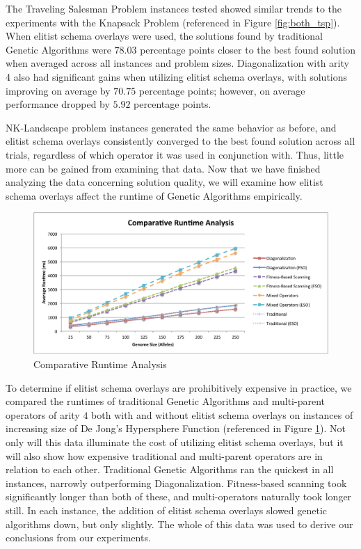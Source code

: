 The Traveling Salesman Problem instances tested showed similar trends to the experiments with the Knapsack Problem (referenced in Figure \ref{fig:both_tsp}). When elitist schema overlays were used, the solutions found by traditional Genetic Algorithms were $78.03$ percentage points closer to the best found solution when averaged across all instances and problem sizes. Diagonalization with arity 4 also had significant gains when utilizing elitist schema overlays, with solutions improving on average by $70.75$ percentage points; however, on average performance dropped by $5.92$ percentage points.


NK-Landscape problem instances generated the same behavior as before, and elitist schema overlays consistently converged to the best found solution across all trials, regardless of which operator it was used in conjunction with. Thus, little more can be gained from examining that data. Now that we have finished analyzing the data concerning solution quality, we will examine how elitist schema overlays affect the runtime of Genetic Algorithms empirically. 

\begin{figure}[htbp!]
\centering
\includegraphics[scale=0.60]{charts/Runtime.pdf}
\caption{Comparative Runtime Analysis}
\label{fig:runtime}
\end{figure}

To determine if elitist schema overlays are prohibitively expensive in practice, we compared the runtimes of traditional Genetic Algorithms and multi-parent operators of arity $4$ both with and without elitist schema overlays on instances of increasing size of De Jong's Hypersphere Function (referenced in Figure \ref{fig:runtime}). Not only will this data illuminate the cost of utilizing elitist schema overlays, but it will also show how expensive traditional and multi-parent operators are in relation to each other. Traditional Genetic Algorithms ran the quickest in all instances, narrowly outperforming Diagonalization. Fitness-based scanning took significantly longer than both of these, and multi-operators naturally took longer still. In each instance, the addition of elitist schema overlays slowed genetic algorithms down, but only slightly. The whole of this data was used to derive our conclusions from our experiments.